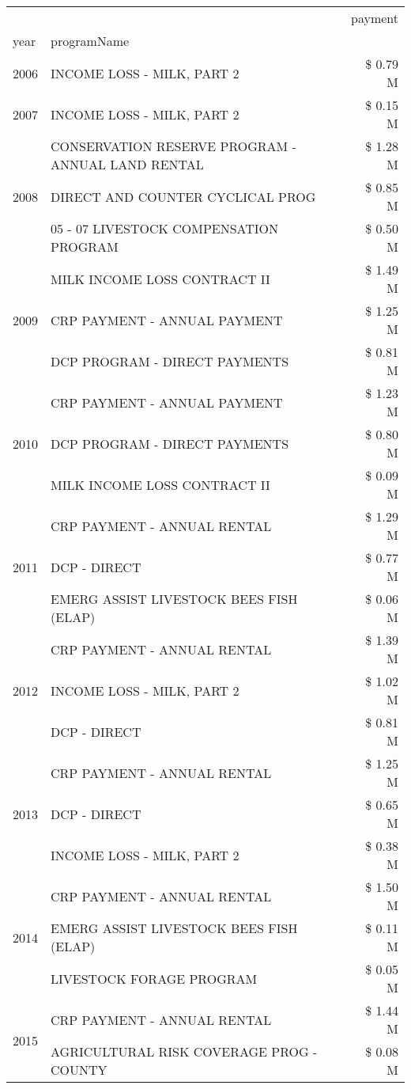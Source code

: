 \begin{tabular}{llr}
\toprule
 &  & payment \\
year & programName &  \\
\midrule
2006 & INCOME LOSS - MILK, PART 2 & \$ 0.79 M \\
\cline{1-3}
2007 & INCOME LOSS - MILK, PART 2 & \$ 0.15 M \\
\cline{1-3}
\multirow[t]{3}{*}{2008} & CONSERVATION RESERVE PROGRAM - ANNUAL LAND RENTAL & \$ 1.28 M \\
 & DIRECT AND COUNTER CYCLICAL PROG & \$ 0.85 M \\
 & 05 - 07 LIVESTOCK COMPENSATION PROGRAM & \$ 0.50 M \\
\cline{1-3}
\multirow[t]{3}{*}{2009} & MILK INCOME LOSS CONTRACT II & \$ 1.49 M \\
 & CRP PAYMENT - ANNUAL PAYMENT & \$ 1.25 M \\
 & DCP PROGRAM - DIRECT PAYMENTS & \$ 0.81 M \\
\cline{1-3}
\multirow[t]{3}{*}{2010} & CRP PAYMENT - ANNUAL PAYMENT & \$ 1.23 M \\
 & DCP PROGRAM - DIRECT PAYMENTS & \$ 0.80 M \\
 & MILK INCOME LOSS CONTRACT II & \$ 0.09 M \\
\cline{1-3}
\multirow[t]{3}{*}{2011} & CRP PAYMENT - ANNUAL RENTAL & \$ 1.29 M \\
 & DCP - DIRECT & \$ 0.77 M \\
 & EMERG ASSIST LIVESTOCK BEES FISH (ELAP) & \$ 0.06 M \\
\cline{1-3}
\multirow[t]{3}{*}{2012} & CRP PAYMENT - ANNUAL RENTAL & \$ 1.39 M \\
 & INCOME LOSS - MILK, PART 2 & \$ 1.02 M \\
 & DCP - DIRECT & \$ 0.81 M \\
\cline{1-3}
\multirow[t]{3}{*}{2013} & CRP PAYMENT - ANNUAL RENTAL & \$ 1.25 M \\
 & DCP - DIRECT & \$ 0.65 M \\
 & INCOME LOSS - MILK, PART 2 & \$ 0.38 M \\
\cline{1-3}
\multirow[t]{3}{*}{2014} & CRP PAYMENT - ANNUAL RENTAL & \$ 1.50 M \\
 & EMERG ASSIST LIVESTOCK BEES FISH (ELAP) & \$ 0.11 M \\
 & LIVESTOCK FORAGE PROGRAM & \$ 0.05 M \\
\cline{1-3}
\multirow[t]{3}{*}{2015} & CRP PAYMENT - ANNUAL RENTAL & \$ 1.44 M \\
 & AGRICULTURAL RISK COVERAGE PROG - COUNTY & \$ 0.08 M \\

\end{tabular}
